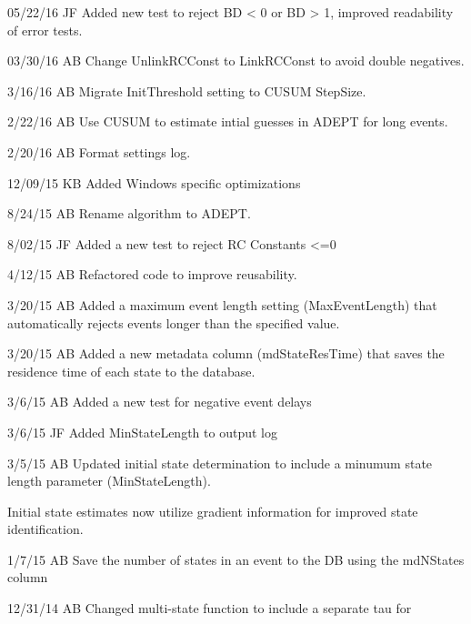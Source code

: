 \documentclass[letterpaper,10pt,english]{sphinxmanual}
\begin{document}
\begin{DUlineblock}{0em}
\item[] 05/22/16    JF  Added new test to reject BD \textless{} 0 or BD \textgreater{} 1, improved readability of error tests.
\item[] 03/30/16        AB      Change UnlinkRCConst to LinkRCConst to avoid double negatives.
\item[] 3/16/16         AB      Migrate InitThreshold setting to CUSUM StepSize.
\item[] 2/22/16         AB      Use CUSUM to estimate intial guesses in ADEPT for long events.
\item[] 2/20/16         AB      Format settings log.
\item[] 12/09/15        KB      Added Windows specific optimizations
\item[] 8/24/15         AB      Rename algorithm to ADEPT.
\item[] 8/02/15         JF      Added a new test to reject RC Constants \textless{}=0
\item[] 4/12/15         AB      Refactored code to improve reusability.
\item[] 3/20/15         AB      Added a maximum event length setting (MaxEventLength) that automatically rejects events longer than the specified value.
\item[] 3/20/15         AB      Added a new metadata column (mdStateResTime) that saves the residence time of each state to the database.
\item[] 3/6/15          AB      Added a new test for negative event delays
\item[] 3/6/15          JF      Added MinStateLength to output log
\item[] 3/5/15          AB      Updated initial state determination to include a minumum state length parameter (MinStateLength).
\item[]
\begin{DUlineblock}{\DUlineblockindent}
\item[] Initial state estimates now utilize gradient information for improved state identification.
\end{DUlineblock}
\item[] 1/7/15          AB  Save the number of states in an event to the DB using the mdNStates column
\item[] 12/31/14        AB      Changed multi-state function to include a separate tau for
\item[]
\begin{DUlineblock}{\DUlineblockindent}

\end{DUlineblock}
\end{DUlineblock}
\end{document}
